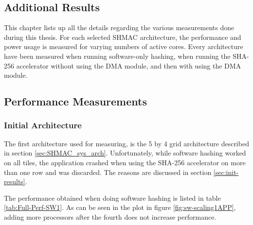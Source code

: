 \begin{appendix}
\chapter{Additional Results}
\label{app:performance}

This chapter lists up all the details regarding the various measurements done during this thesis.
For each selected SHMAC architecture, the performance and power usage is measured for varying numbers
of active cores. Every architecture have been measured when running software-only hashing, when running
the SHA-256 accelerator without using the DMA module, and then with using the DMA module. 

\section{Performance Measurements}

\subsection{Initial Architecture}

The first architecture used for measuring, is the 5 by 4 grid architecture described in section \ref{sec:SHMAC_sys_arch}.
Unfortunately, while software hashing worked on all tiles, the application crashed when using the SHA-256 accelerator on more than one row
and was discarded. The reasons are discussed in section \ref{sec:init-results}.

The performance obtained when doing software hashing is listed in table \ref{tab:Full-Perf-SW1}. 
As can be seen in the plot in figure \ref{fig:sw-scaling1APP}, adding more processors after the fourth does not increase performance.


\end{appendix}
